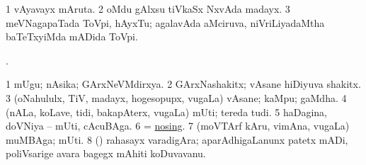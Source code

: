 \bentry
{}
\gl{\nA}
\bmng
\bnum
\num{1} vAyavayx mAruta. 
\num{2} oMdu gAlxsu tiVkaSx NxvAda madayx. 
\num{3} meVNagapaTada ToVpi, hAyxTu; agalavAda aMciruva, niVriLiyadaMtha baTeTxyiMda mADida ToVpi. 
\enum
\emng
\eentry

\bentry
{}
\gl{\saMkiSx}
\bmng
{}. 
\emng
\eentry

\bentry
{}
\gl{\nA}
\bmng
\bnum
\num{1} mUgu; nAsika; GArxNeVMdirxya. 
\num{2} GArxNashakitx; vAsane hiDiyuva shakitx. 
\num{3} (oNahululx, TiV, madayx, hogesopupx, \mo vugaLa) vAsane; kaMpu; gaMdha. 
\num{4} (nALa, koLave, tidi, bakapAterx, \mo vugaLa) mUti; tereda tudi. 
\num{5} haDagina, doVNiya -- mUti, cAcuBAga. 
\num{6} = \hyperlink{nosing}{nosing}. 
\num{7} (moVTArf kAru, vimAna, \mo vugaLa) muMBAga; mUti. 
\num{8} (\ashi) rahasayx varadigAra; aparAdhigaLanunx patetx mADi, poliVsarige avara bagegx mAhiti koDuvavanu. 
\enum
\emng

